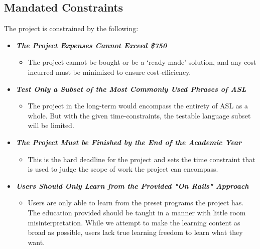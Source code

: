 \documentclass[12pt, titlepage]{article}
\begin{document}

\subsection{Mandated Constraints}

The project is constrained by the following:

\begin{itemize}
    \item[] \textbf{\textit{The Project Expenses Cannot Exceed \$750}}
    \begin{itemize}
        \item The project cannot be bought or be a `ready-made' solution, and any cost incurred must be minimized to ensure cost-efficiency.
    \end{itemize}
    \item[] \textbf{\textit{Test Only a Subset of the Most Commonly Used Phrases of ASL}}
    \begin{itemize}
        \item The project in the long-term would encompass the entirety of ASL as a whole. But with the given time-constraints, the testable language subset will be limited.
    \end{itemize}
    \item[] \textbf{\textit{The Project Must be Finished by the End of the Academic Year}}
    \begin{itemize}
        \item This is the hard deadline for the project and sets the time constraint that is used to judge the scope of work the project can encompass.
    \end{itemize}
    \item[] \textbf{\textit{Users Should Only Learn from the Provided "On Rails" Approach}}
    \begin{itemize}
        \item Users are only able to learn from the preset programs the project has. The education provided should be taught in a manner with little room misinterpretation. While we attempt to make the learning content as broad as possible, users lack true learning freedom to learn what they want.
    \end{itemize}
\end{itemize}
\end{document}
